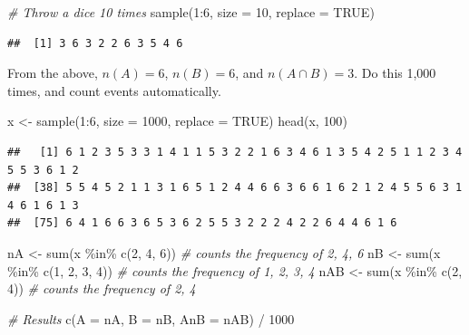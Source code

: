 \documentclass[
]{book}
\newenvironment{Shaded}{\begin{snugshade}}{\end{snugshade}}
\newcommand{\AttributeTok}[1]{\textcolor[rgb]{0.77,0.63,0.00}{#1}}
\newcommand{\CommentTok}[1]{\textcolor[rgb]{0.56,0.35,0.01}{\textit{#1}}}
\newcommand{\ConstantTok}[1]{\textcolor[rgb]{0.00,0.00,0.00}{#1}}
\newcommand{\DecValTok}[1]{\textcolor[rgb]{0.00,0.00,0.81}{#1}}
\newcommand{\FunctionTok}[1]{\textcolor[rgb]{0.00,0.00,0.00}{#1}}
\newcommand{\NormalTok}[1]{#1}
\newcommand{\OtherTok}[1]{\textcolor[rgb]{0.56,0.35,0.01}{#1}}
\newcommand{\SpecialCharTok}[1]{\textcolor[rgb]{0.00,0.00,0.00}{#1}}
\theoremstyle{definition}
\theoremstyle{definition}
\theoremstyle{definition}
\theoremstyle{definition}
\theoremstyle{remark}
\begin{document}
\begin{Shaded}
\begin{Highlighting}[]
\CommentTok{\# Throw a dice 10 times}
\FunctionTok{sample}\NormalTok{(}\DecValTok{1}\SpecialCharTok{:}\DecValTok{6}\NormalTok{, }\AttributeTok{size =} \DecValTok{10}\NormalTok{, }\AttributeTok{replace =} \ConstantTok{TRUE}\NormalTok{)}
\end{Highlighting}
\end{Shaded}

\begin{verbatim}
##  [1] 3 6 3 2 2 6 3 5 4 6
\end{verbatim}

From the above, \(n(A) = 6\), \(n(B)=6\), and \(n(A \cap B)=3\).
Do this 1,000 times, and count events automatically.

\begin{Shaded}
\begin{Highlighting}[]
\NormalTok{x }\OtherTok{\textless{}{-}} \FunctionTok{sample}\NormalTok{(}\DecValTok{1}\SpecialCharTok{:}\DecValTok{6}\NormalTok{, }\AttributeTok{size =} \DecValTok{1000}\NormalTok{, }\AttributeTok{replace =} \ConstantTok{TRUE}\NormalTok{)}
\FunctionTok{head}\NormalTok{(x, }\DecValTok{100}\NormalTok{)}
\end{Highlighting}
\end{Shaded}

\begin{verbatim}
##   [1] 6 1 2 3 5 3 3 1 4 1 1 5 3 2 2 1 6 3 4 6 1 3 5 4 2 5 1 1 2 3 4 5 5 3 6 1 2
##  [38] 5 5 4 5 2 1 1 3 1 6 5 1 2 4 4 6 6 3 6 6 1 6 2 1 2 4 5 5 6 3 1 4 6 1 6 1 3
##  [75] 6 4 1 6 6 3 6 5 3 6 2 5 5 3 2 2 2 4 2 2 6 4 4 6 1 6
\end{verbatim}

\begin{Shaded}
\begin{Highlighting}[]
\NormalTok{nA }\OtherTok{\textless{}{-}} \FunctionTok{sum}\NormalTok{(x }\SpecialCharTok{\%in\%} \FunctionTok{c}\NormalTok{(}\DecValTok{2}\NormalTok{, }\DecValTok{4}\NormalTok{, }\DecValTok{6}\NormalTok{))  }\CommentTok{\# counts the frequency of 2, 4, 6}
\NormalTok{nB }\OtherTok{\textless{}{-}} \FunctionTok{sum}\NormalTok{(x }\SpecialCharTok{\%in\%} \FunctionTok{c}\NormalTok{(}\DecValTok{1}\NormalTok{, }\DecValTok{2}\NormalTok{, }\DecValTok{3}\NormalTok{, }\DecValTok{4}\NormalTok{))  }\CommentTok{\# counts the frequency of 1, 2, 3, 4}
\NormalTok{nAB }\OtherTok{\textless{}{-}} \FunctionTok{sum}\NormalTok{(x }\SpecialCharTok{\%in\%} \FunctionTok{c}\NormalTok{(}\DecValTok{2}\NormalTok{, }\DecValTok{4}\NormalTok{))  }\CommentTok{\# counts the frequency of 2, 4}

\CommentTok{\# Results}
\FunctionTok{c}\NormalTok{(}\AttributeTok{A =}\NormalTok{ nA, }\AttributeTok{B =}\NormalTok{ nB, }\AttributeTok{AnB =}\NormalTok{ nAB) }\SpecialCharTok{/} \DecValTok{1000}
\end{Highlighting}
\end{Shaded}
\end{document}
